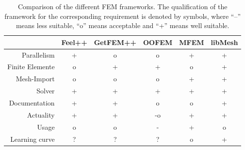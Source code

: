   \begin{landscape}
   \begin{table}
    \centering
	\begin{tabular}{|r|c|c|c|c|c|}\hline
                    & Feel++ & GetFEM++ & OOFEM & MFEM & libMesh \\\hline
	Parallelism     & + & o & o & + & + \\\hline
	Finite Elemente & o & + & + & o & + \\\hline
	Mesh-Import     & o & o & o & + & + \\\hline
	Solver          & + & + & + & + & + \\\hline
	Documentation   & + & + & o & o & + \\\hline
	Actuality       & + & + & -o& + & + \\\hline
	Usage           & o & o & - & + & o \\\hline
	Learning curve  & ? & ? & ? & o & + \\\hline
    \end{tabular}
  	\caption{Comparison of the different FEM frameworks. The qualification of the framework for the corresponding requirement is denoted by symbols, where ``--'' means less suitable, ``o'' means acceptable and ``+'' means well suitable.}
  \end{table}
  \end{landscape}
  
  
\newpage